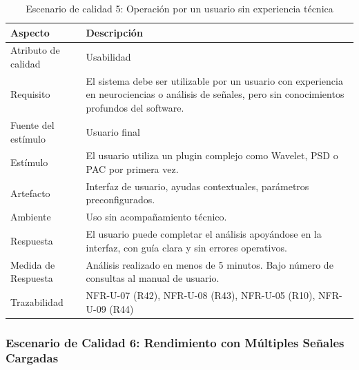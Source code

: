 \documentclass[11pt,a4paper]{article}
\DeclareRobustCommand{\_}{\textunderscore\allowbreak}
\begin{document}
\begin{table}[H]
\centering
\caption{Escenario de calidad 5: Operación por un usuario sin experiencia técnica}
\label{tab:escenario5}
\begin{tabularx}{\textwidth}{|l|X|}
\hline
\textbf{Aspecto} & \textbf{Descripción} \\
\hline
Atributo de calidad & Usabilidad \\
\hline
Requisito & El sistema debe ser utilizable por un usuario con experiencia en neurociencias o análisis de señales, pero sin conocimientos profundos del software. \\
\hline
Fuente del estímulo & Usuario final \\
\hline
Estímulo & El usuario utiliza un plugin complejo como Wavelet, PSD o PAC por primera vez. \\
\hline
Artefacto & Interfaz de usuario, ayudas contextuales, parámetros preconfigurados. \\
\hline
Ambiente & Uso sin acompañamiento técnico. \\
\hline
Respuesta & El usuario puede completar el análisis apoyándose en la interfaz, con guía clara y sin errores operativos. \\
\hline
Medida de Respuesta & Análisis realizado en menos de 5 minutos. Bajo número de consultas al manual de usuario. \\
\hline
Trazabilidad & NFR-U-07 (R42), NFR-U-08 (R43), NFR-U-05 (R10), NFR-U-09 (R44) \\
\hline
\end{tabularx}
\end{table}

\subsubsection{Escenario de Calidad 6: Rendimiento con Múltiples Señales Cargadas}
\end{document}
